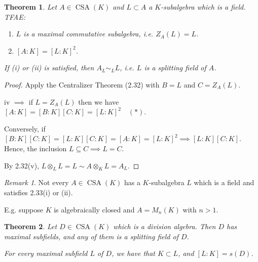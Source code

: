 \documentclass{article}
\theoremstyle{definition}
\theoremstyle{plain}
\newtheorem{theorem}{Theorem}[section]
\theoremstyle{remark}
\newtheorem*{remark*}{Remark}
\begin{document}
    \begin{theorem}
        Let \(A \in \operatorname{CSA}(K)\) and \(L \subset A\) a \(K\)-subalgebra which is a field. TFAE:

        \begin{enumerate}[label=\roman*)]
            \item \(L\) is a maximal commutative subalgebra, i.e. \(Z_A(L) = L\). 
            \item  \([A:K] = [L:K]^2\).
        \end{enumerate} 

        If (i) or (ii) is satisfied, then \(A_L \sim_L L\), i.e. \(L\) is a splitting field of \(A\).
    \end{theorem}

    \begin{proof}
        Apply the Centralizer Theorem (2.32) with \(B = L\) and \(C = Z_A(L)\).

        iv \(\implies\) if \(L = Z_A(L)\) then we have \([A:K]=[B:K][C:K]=[L:K]^2\quad(\ast)\).
        
        Conversely, if \([B:K][C:K] = [L:K][C:K] = [A:K] = [L:K]^2 \implies [L:K][C:K]\). Hence, the inclusion \(L \subseteq C \implies L = C\). 
        
        By 2.32(v), \(L \otimes_L L = L \sim A \otimes_K L = A_L\).
    \end{proof}

    \begin{remark*}
        Not every \(A \in \operatorname{CSA}(K)\) has a \(K\)-subalgebra \(L\) which is a field and satisfies 2.33(i) or (ii).

        E.g. suppose \(K\) is algebraically closed and \(A = M_n(K)\) with \(n > 1\).
    \end{remark*}

    \begin{theorem}
        Let \(D \in \operatorname{CSA}(K)\) which is a division algebra. Then \(D\) has maximal subfields, and any of them is a splitting field of \(D\).

        For every maximal subfield \(L\) of \(D\), we have that \(K \subset L\), and \([L : K] = s(D)\).
    \end{theorem}
\end{document}

